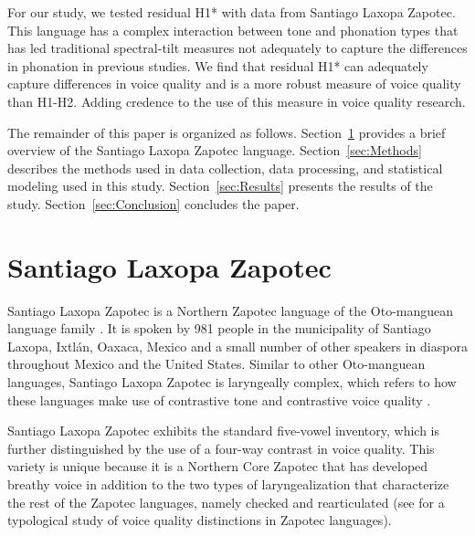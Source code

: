 For our study, we tested residual H1* with data from Santiago Laxopa Zapotec. This language has a complex interaction between tone and phonation types that has led traditional spectral-tilt measures not adequately to capture the differences in phonation in previous studies. We find that residual H1* can adequately capture differences in voice quality and is a more robust measure of voice quality than H1-H2. Adding credence to the use of this measure in voice quality research. 

The remainder of this paper is organized as follows. Section~\ref{sec:SLZ} provides a brief overview of the Santiago Laxopa Zapotec language. Section~\ref{sec:Methods} describes the methods used in data collection, data processing, and statistical modeling used in this study. Section~\ref{sec:Results} presents the results of the study. Section~\ref{sec:Conclusion} concludes the paper.

\section{Santiago Laxopa Zapotec} \label{sec:SLZ}
Santiago Laxopa Zapotec is a Northern Zapotec language of the Oto-manguean language family \citep{adlerAcousticsPhonationTypes2016,adlerDerivationVerbInitiality2018,foleyForbiddenCliticClusters2018,foleyExtendingPersonCaseConstraint2020,sichelPronounsAttractionSierra2020, sichelFeaturalLifeNominals2020,brinkerhoffDownstepSantiagoLaxopaMFM,brinkerhoffTonalPatternsTheir2022}. It is spoken by 981 people in the municipality of Santiago Laxopa, Ixtlán, Oaxaca, Mexico \citep{SantiagoLaxopaEconomy} and a small number of other speakers in diaspora throughout Mexico and the United States. Similar to other Oto-manguean languages, Santiago Laxopa Zapotec is laryngeally complex, which refers to how these languages make use of contrastive tone and contrastive voice quality \citep{silvermanLaryngealComplexityOtomanguean1997,silvermanPhasingRecoverability1997,blankenshipTimeCourseBreathiness1997,blankenshipTimingNonmodalPhonation2002}. 

Santiago Laxopa Zapotec exhibits the standard five-vowel inventory, which is further distinguished by the use of a four-way contrast in voice quality. This variety is unique because it is a Northern Core Zapotec that has developed breathy voice in addition to the two types of laryngealization that characterize the rest of the Zapotec languages, namely checked and rearticulated (see \citet{ariza-garciaPhonationTypesTones2018} for a typological study of voice quality distinctions in Zapotec languages).

